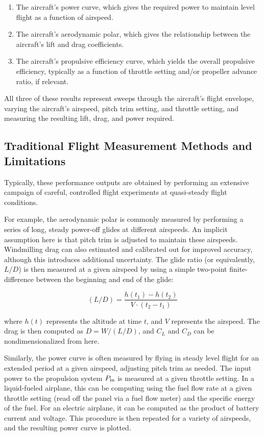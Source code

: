 \documentclass[conf]{new-aiaa}
\begin{document}
    \begin{enumerate}
        \item The aircraft's power curve, which gives the required power to maintain level flight as a function of airspeed.
        \item The aircraft's aerodynamic polar, which gives the relationship between the aircraft's lift and drag coefficients.
        \item The aircraft's propulsive efficiency curve, which yields the overall propulsive efficiency, typically as a function of throttle setting and/or propeller advance ratio, if relevant.
    \end{enumerate}

    All three of these results represent sweeps through the aircraft's flight envelope, varying the aircraft's airspeed, pitch trim setting, and throttle setting, and measuring the resulting lift, drag, and power required.

    \subsection{Traditional Flight Measurement Methods and Limitations}

    Typically, these performance outputs are obtained by performing an extensive campaign of careful, controlled flight experiments at quasi-steady flight conditions.

    For example, the aerodynamic polar is commonly measured by performing a series of long, steady power-off glides at different airspeeds. An implicit assumption here is that pitch trim is adjusted to maintain these airspeeds. Windmilling drag can also estimated and calibrated out for improved accuracy, although this introduces additional uncertainty. The glide ratio (or equivalently, $L/D$) is then measured at a given airspeed by using a simple two-point finite-difference between the beginning and end of the glide:

    $$(L/D) = \frac{h(t_1) - h(t_2)}{V \cdot (t_2 - t_1)}$$

    where $h(t)$ represents the altitude at time $t$, and $V$ represents the airspeed. The drag is then computed as $D = W / (L/D)$, and $C_L$ and $C_D$ can be nondimensionalized from here.

    Similarly, the power curve is often measured by flying in steady level flight for an extended period at a given airspeed, adjusting pitch trim as needed. The input power to the propulsion system $P_{\rm in}$ is measured at a given throttle setting. In a liquid-fueled airplane, this can be computing using the fuel flow rate at a given throttle setting (read off the panel via a fuel flow meter) and the specific energy of the fuel. For an electric airplane, it can be computed as the product of battery current and voltage. This procedure is then repeated for a variety of airspeeds, and the resulting power curve is plotted.
\end{document}
